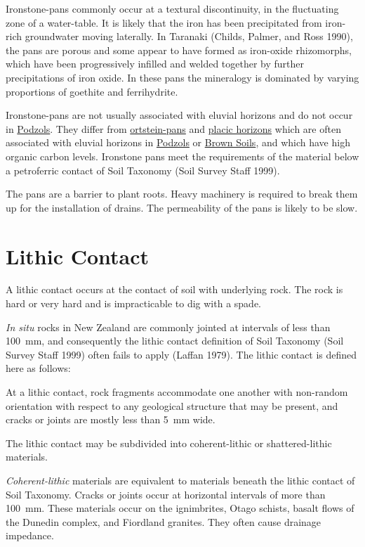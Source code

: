 \documentclass[
  letterpaper,
  DIV=11,
  numbers=noendperiod]{scrreprt}
\begin{document}
Ironstone-pans commonly occur at a textural discontinuity, in the
fluctuating zone of a water-table. It is likely that the iron has been
precipitated from iron-rich groundwater moving laterally. In Taranaki
(Childs, Palmer, and Ross 1990), the pans are porous and some appear to
have formed as iron-oxide rhizomorphs, which have been progressively
infilled and welded together by further precipitations of iron oxide. In
these pans the mineralogy is dominated by varying proportions of
goethite and ferrihydrite.

Ironstone-pans are not usually associated with eluvial horizons and do
not occur in \protect\hyperlink{sec-ord-Z}{Podzols}. They differ from
\protect\hyperlink{sec-diag-opan}{ortstein-pans} and
\protect\hyperlink{sec-diag-plac}{placic horizons} which are often
associated with eluvial horizons in
\protect\hyperlink{sec-ord-Z}{Podzols} or
\protect\hyperlink{sec-ord-B}{Brown Soils}, and which have high organic
carbon levels. Ironstone pans meet the requirements of the material
below a petroferric contact of Soil Taxonomy (Soil Survey Staff 1999).

The pans are a barrier to plant roots. Heavy machinery is required to
break them up for the installation of drains. The permeability of the
pans is likely to be slow.

\hypertarget{sec-diag-lithc}{%
\section{Lithic Contact}\label{sec-diag-lithc}}

A lithic contact occurs at the contact of soil with underlying rock. The
rock is hard or very hard and is impracticable to dig with a spade.

\emph{In situ} rocks in New Zealand are commonly jointed at intervals of
less than 100~mm, and consequently the lithic contact definition of Soil
Taxonomy (Soil Survey Staff 1999) often fails to apply (Laffan 1979).
The lithic contact is defined here as follows:

At a lithic contact, rock fragments accommodate one another with
non-random orientation with respect to any geological structure that may
be present, and cracks or joints are mostly less than 5~mm wide.

The lithic contact may be subdivided into coherent-lithic or
shattered-lithic materials.

\emph{Coherent-lithic} materials are equivalent to materials beneath the
lithic contact of Soil Taxonomy. Cracks or joints occur at horizontal
intervals of more than 100~mm. These materials occur on the ignimbrites,
Otago schists, basalt flows of the Dunedin complex, and Fiordland
granites. They often cause drainage impedance.
\end{document}
